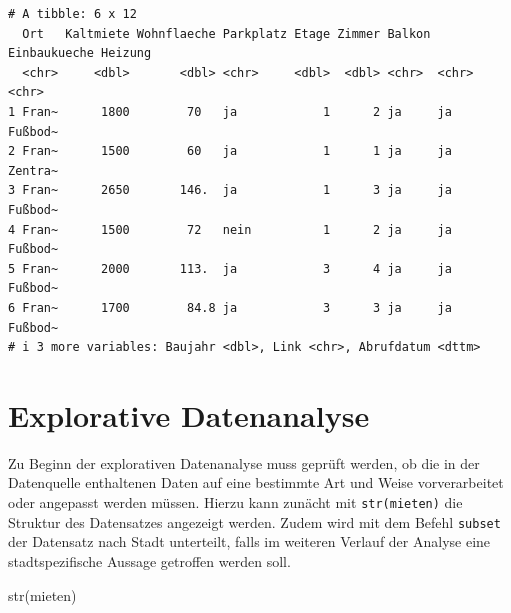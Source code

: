 \documentclass[
  a4paper,
  DIV=11]{scrartcl}
\newenvironment{Shaded}{\begin{snugshade}}{\end{snugshade}}
\newcommand{\FunctionTok}[1]{\textcolor[rgb]{0.28,0.35,0.67}{#1}}
\newcommand{\NormalTok}[1]{\textcolor[rgb]{0.00,0.23,0.31}{#1}}
\begin{document}
\begin{verbatim}
# A tibble: 6 x 12
  Ort   Kaltmiete Wohnflaeche Parkplatz Etage Zimmer Balkon Einbaukueche Heizung
  <chr>     <dbl>       <dbl> <chr>     <dbl>  <dbl> <chr>  <chr>        <chr>  
1 Fran~      1800        70   ja            1      2 ja     ja           Fußbod~
2 Fran~      1500        60   ja            1      1 ja     ja           Zentra~
3 Fran~      2650       146.  ja            1      3 ja     ja           Fußbod~
4 Fran~      1500        72   nein          1      2 ja     ja           Fußbod~
5 Fran~      2000       113.  ja            3      4 ja     ja           Fußbod~
6 Fran~      1700        84.8 ja            3      3 ja     ja           Fußbod~
# i 3 more variables: Baujahr <dbl>, Link <chr>, Abrufdatum <dttm>
\end{verbatim}

\hypertarget{explorative-datenanalyse}{%
\section{Explorative Datenanalyse}\label{explorative-datenanalyse}}

Zu Beginn der explorativen Datenanalyse muss geprüft werden, ob die in
der Datenquelle enthaltenen Daten auf eine bestimmte Art und Weise
vorverarbeitet oder angepasst werden müssen. Hierzu kann zunächt mit
\texttt{str(mieten)} die Struktur des Datensatzes angezeigt werden.
Zudem wird mit dem Befehl \texttt{subset} der Datensatz nach Stadt
unterteilt, falls im weiteren Verlauf der Analyse eine stadtspezifische
Aussage getroffen werden soll.

\begin{Shaded}
\begin{Highlighting}[]
\FunctionTok{str}\NormalTok{(mieten)}
\end{Highlighting}
\end{Shaded}
\end{document}
